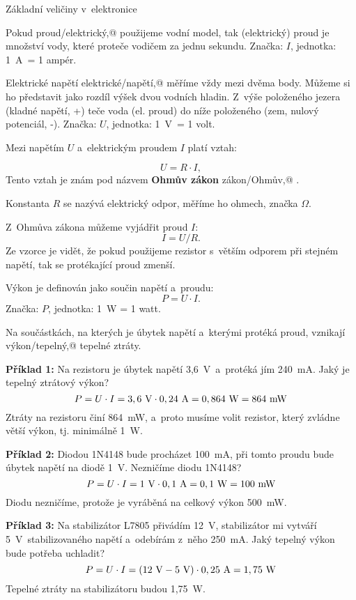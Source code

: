 \sec Základní veličiny v~elektronice 


Pokud \ii proud/elektrický,@ použijeme vodní model, tak (elektrický) proud je množství vody, které proteče vodičem za jednu sekundu. Značka: $I$, jednotka: 1~A~= 1 ampér. 


Elektrické napětí \ii elektrické/napětí,@ měříme vždy mezi dvěma body. Můžeme si ho představit jako rozdíl výšek dvou vodních hladin. Z~výše položeného jezera (kladné napětí, +) teče voda (el. proud) do níže položeného (zem, nulový potenciál, -). Značka: $U$, jednotka: 1~V~= 1 volt.



Mezi napětím $U$ a~elektrickým proudem $I$ platí vztah:

$$U = R \cdot I,$$ 
Tento vztah je znám pod názvem {\bf Ohmův zákon} \ii zákon/Ohmův,@ . 

Konstanta $R$ se nazývá elektrický odpor, měříme ho ohmech, značka $\Omega$. 

Z~Ohmůva zákona můžeme vyjádřit proud $ I $: 
$$ I = U / R .$$ Ze vzorce je vidět, že pokud použijeme rezistor s~větším odporem při stejném napětí, tak se protékající proud zmenší. 

Výkon  je definován jako součin napětí a~proudu:
$$P = U \cdot I.$$ Značka: $P$, jednotka: 1~W = 1 watt.


Na součástkách, na kterých je úbytek napětí a~kterými protéká proud, vznikají \ii výkon/tepelný,@ tepelné ztráty. 

{\bf Příklad 1:} Na rezistoru je úbytek napětí 3,6~V~a~protéká jím 240~mA. Jaký je tepelný ztrátový výkon?
$$P = U \cdot I = \rm 3,6\ V \cdot 0,24\ A = 0,864\ W = 864\ mW$$
Ztráty na rezistoru činí 864~mW, a~proto musíme volit rezistor, který zvládne větší výkon, tj. minimálně 1~W. 

{\bf Příklad 2:} Diodou 1N4148 bude procházet 100~mA, při tomto proudu bude úbytek napětí na diodě 1~V. Nezničíme diodu 1N4148?
$$P = U \cdot I = \rm 1\ V \cdot 0,1\ A = 0,1\ W = 100\ mW$$
Diodu nezničíme, protože je vyráběná na celkový výkon 500~mW. 

{\bf Příklad 3:} Na stabilizátor L7805 přivádím 12~V, stabilizátor mi vytváří 5~V~stabilizovaného napětí a~odebírám z~něho 250~mA. Jaký tepelný výkon bude potřeba uchladit?
$$P = U \cdot I = \rm (12\ V - 5\ V) \cdot 0,25\ A = 1,75\ W$$
Tepelné ztráty na stabilizátoru budou 1,75~W.

